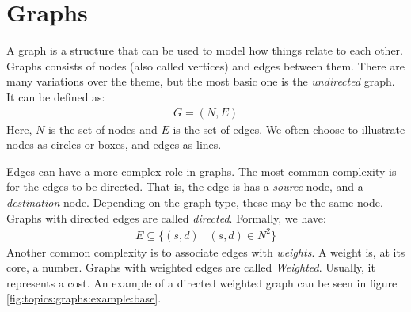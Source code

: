 \section{Graphs}

A graph is a structure that can be used to model how things relate to each other. Graphs consists of nodes (also called vertices) and edges between them. There are many variations over the theme, but the most basic one is the \textsl{undirected} graph. It can be defined as:
\begin{eqnarray*}
  G = (N,E)
\end{eqnarray*}
Here, $N$ is the set of nodes and $E$ is the set of edges. We often choose to illustrate nodes as circles or boxes, and edges as lines.

Edges can have a more complex role in graphs. The most common complexity is for the edges to be directed. That is, the edge is has a \textsl{source} node, and a \textsl{destination} node. Depending on the graph type, these may be the same node. Graphs with directed edges are called \textsl{directed}. Formally, we have:
\begin{eqnarray*}
  E \subseteq \{ (s,d) \mid (s,d) \in N^2 \}
\end{eqnarray*}
Another common complexity is to associate edges with \textsl{weights}. A weight is, at its core, a number. Graphs with weighted edges are called \textsl{Weighted}. Usually, it represents a cost. An example of a directed weighted graph can be seen in figure \ref{fig:topics:graphs:example:base}.

